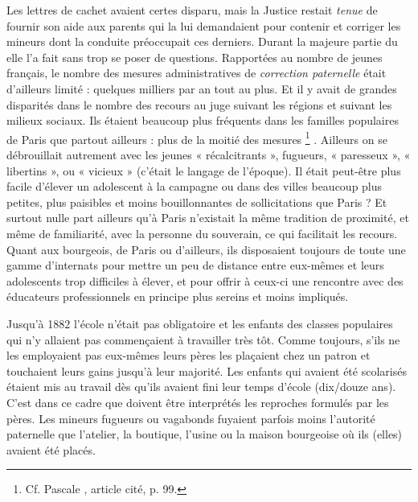  Les lettres de cachet avaient certes disparu, mais la Justice restait \emph{tenue} de fournir son aide aux parents qui la lui demandaient pour contenir et corriger les mineurs dont la conduite préoccupait ces derniers. Durant la majeure partie du  elle l'a fait sans trop se poser de questions. Rapportées au nombre de jeunes français, le nombre des mesures administratives de \emph{correction paternelle} était d'ailleurs limité : quelques milliers par an tout au plus. Et il y avait de grandes disparités dans le nombre des recours au juge suivant les régions et suivant les milieux sociaux. Ils étaient beaucoup plus fréquents dans les familles populaires de Paris que partout ailleurs : plus de la moitié des mesures%
\footnote{Cf. Pascale , article cité, p. 99.}%
. Ailleurs on se débrouillait autrement avec les jeunes « récalcitrants », fugueurs, « paresseux », « libertins », ou « vicieux » (c'était le langage de l'époque). Il était peut-être plus facile d'élever un adolescent à la campagne ou dans des villes beaucoup plus petites, plus paisibles et moins bouillonnantes de sollicitations que Paris ? Et surtout nulle part ailleurs qu'à Paris n'existait la même tradition de proximité, et même de familiarité, avec la personne du souverain, ce qui facilitait les recours. Quant aux bourgeois, de Paris ou d'ailleurs, ils disposaient toujours de toute une gamme d'internats pour mettre un peu de distance entre eux-mêmes et leurs adolescents trop difficiles à élever, et pour offrir à ceux-ci une rencontre avec des éducateurs professionnels en principe plus sereins et moins impliqués.

 Jusqu'à 1882 l'école n'était pas obligatoire et les enfants des classes populaires qui n'y allaient pas commençaient à travailler très tôt. Comme toujours, s'ils ne les employaient pas eux-mêmes leurs pères les plaçaient chez un patron et touchaient leurs gains jusqu'à leur majorité. Les enfants qui avaient été scolarisés étaient mis au travail dès qu'ils avaient fini leur temps d'école (dix/douze ans). C'est dans ce cadre que doivent être interprétés les reproches formulés par les pères. Les mineurs fugueurs ou vagabonds fuyaient parfois moins l'autorité paternelle que l'atelier, la boutique, l'usine ou la maison bourgeoise où ils (elles) avaient été placés.

